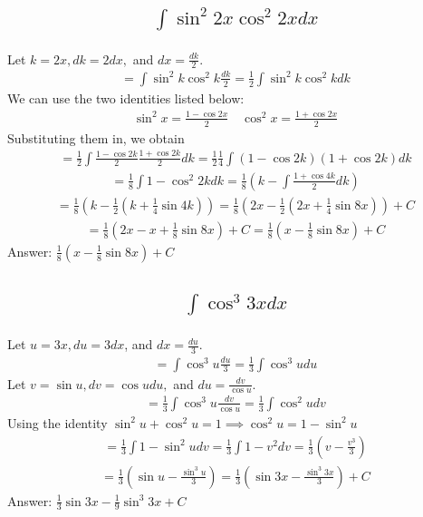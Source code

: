 \documentclass{article}
\begin{document}
\subsection{
	\begin{align*}
		\int{\sin^2{2x} \cos^2{2x} dx}
	\end{align*}
}
Let $k = 2x, dk = 2dx,$ and $dx = \frac{dk}{2}$. 
\begin{align*}
	= \int{\sin^2{k} \cos^2{k} \frac{dk}{2}} = \frac{1}{2} \int{\sin^2{k} \cos^2{k} dk}
\end{align*}
We can use the two identities listed below:
\begin{align*}
	\sin^2{x} = \frac{1 - \cos{2x}}{2} \quad \cos^2{x} = \frac{1 + \cos{2x}}{2}
\end{align*}
Substituting them in, we obtain
\begin{align*}
	= \frac{1}{2} \int{\frac{1 - \cos{2k}}{2} \frac{1 + \cos{2k}}{2} dk} = \frac{1}{2} \frac{1}{4} \int{(1 - \cos{2k})(1 + \cos{2k})dk}
\end{align*}
\begin{align*}
	= \frac{1}{8} \int{1 - \cos^2{2k} dk} = \frac{1}{8} \left( k - \int{\frac{1 + \cos{4k}}{2}} dk \right)
\end{align*}
\begin{align*}
	= \frac{1}{8} \left(k - \frac{1}{2}\left(k + \frac{1}{4}\sin{4k}\right) \right) = \frac{1}{8} \left(2x - \frac{1}{2}\left(2x + \frac{1}{4}\sin{8x}\right)  \right) + C
\end{align*}
\begin{align*}
	= \frac{1}{8} \left( 2x - x + \frac{1}{8}\sin{8x} \right) + C= \frac{1}{8} \left( x - \frac{1}{8} \sin{8x} \right)+ C
\end{align*}
Answer: $\frac{1}{8} \left( x - \frac{1}{8} \sin{8x} \right)+ C$

\subsection{
	\begin{align*}
		\int{\cos^3{3x} dx}
	\end{align*}
}
Let $u = 3x, du = 3dx$, and $dx = \frac{du}{3}$. 
\begin{align*}
	= \int{\cos^3{u} \frac{du}{3}} = \frac{1}{3} \int{\cos^3{u}du}
\end{align*}
Let $v = \sin{u}, dv = \cos{u} du,$ and $du = \frac{dv}{\cos{u}}$. 
\begin{align*}
	= \frac{1}{3} \int{\cos^3{u} \frac{dv}{\cos{u}}} = \frac{1}{3} \int{\cos^2{u} dv}
\end{align*}
Using the identity $\sin^2{u} + \cos^2{u} = 1 \implies \cos^2{u} = 1 - \sin^2{u}$
\begin{align*}
	= \frac{1}{3} \int{1 - \sin^2{u} dv} = \frac{1}{3} \int{1 - v^2 dv} = \frac{1}{3} \left( {v - \frac{v^3}{3}} \right)
\end{align*}
\begin{align*}
	= \frac{1}{3} \left( \sin{u} - \frac{\sin^3{u}}{3} \right) = \frac{1}{3} \left( \sin{3x} - \frac{\sin^3{3x}}{3} \right) + C
\end{align*}
Answer: $\frac{1}{3} \sin{3x} - \frac{1}{9} \sin^3{3x} + C$
\end{document}

